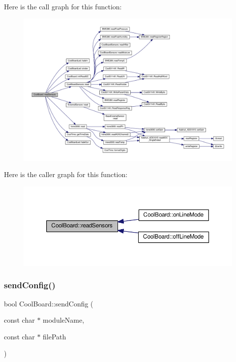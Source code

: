 Here is the call graph for this function\+:
\nopagebreak
\begin{figure}[H]
\begin{center}
\leavevmode
\includegraphics[width=350pt]{class_cool_board_ad03abdce2e65f520bbf2cff0f2d083cf_cgraph}
\end{center}
\end{figure}
Here is the caller graph for this function\+:
\nopagebreak
\begin{figure}[H]
\begin{center}
\leavevmode
\includegraphics[width=350pt]{class_cool_board_ad03abdce2e65f520bbf2cff0f2d083cf_icgraph}
\end{center}
\end{figure}
\mbox{\label{class_cool_board_a705398b11560603fcdd1b9e8e95d0027}} 
\subsubsection{\texorpdfstring{send\+Config()}{sendConfig()}}
{\footnotesize\ttfamily bool Cool\+Board\+::send\+Config (\begin{DoxyParamCaption}\item[{const char $\ast$}]{module\+Name,  }\item[{const char $\ast$}]{file\+Path }\end{DoxyParamCaption})}

